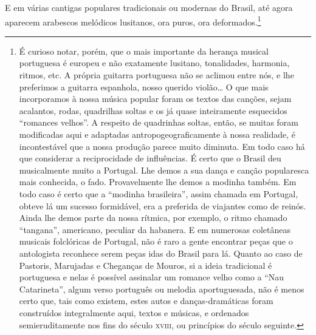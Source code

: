 E em várias cantigas populares tradicionais ou modernas do Brasil, até
agora aparecem arabescos melódicos lusitanos, ora puros, ora deformados.\footnote{É curioso notar, porém, que o mais importante da herança musical
portuguesa é europeu e não exatamente lusitano, tonalidades, harmonia,
ritmos, etc. A própria guitarra portuguesa não se aclimou entre nós, e
lhe preferimos a guitarra espanhola, nosso querido violão\ldots{} O que mais
incorporamos à nossa música popular foram os textos das canções, sejam
acalantos, rodas, quadrilhas soltas e os já quase inteiramente
esquecidos ``romances velhos''. A respeito de quadrinhas soltas, então,
se muitas foram modificadas aqui e adaptadas antropogeograficamente à
nossa realidade, é incontestável que a nossa produção parece muito
diminuta. Em todo caso há que considerar a reciprocidade de influências.
É certo que o Brasil deu musicalmente muito a Portugal. Lhe demos a sua
dança e canção popularesca mais conhecida, o fado. Provavelmente lhe
demos a modinha também. Em todo caso é certo que a ``modinha
brasileira'', assim chamada em Portugal, obteve lá um sucesso
formidável, era a preferida de viajantes como de reinós. Ainda lhe demos
parte da nossa rítmica, por exemplo, o ritmo chamado ``tangana'',
americano, peculiar da habanera. E em numerosas coletâneas musicais
folclóricas de Portugal, não é raro a gente encontrar peças que o
antologista reconhece serem peças idas do Brasil para lá. Quanto ao caso
de Pastoris, Marujadas e Cheganças de Mouros, si a ideia tradicional é
portuguesa e nelas é possível assinalar um romance velho como a ``Nau
Catarineta'', algum verso português ou melodia aportuguesada, não é
menos certo que, tais como existem, estes autos e danças-dramáticas
foram construídos integralmente aqui, textos e músicas, e ordenados
semieruditamente nos fins do século \textsc{xviii}, ou princípios do século
seguinte.}

